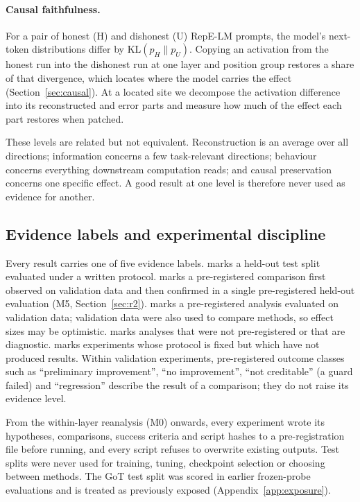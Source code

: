 \paragraph{Causal faithfulness.} For a pair of honest (H) and dishonest (U) RepE-LM prompts, the model's
next-token distributions differ by $\mathrm{KL}(p_H\|p_U)$. Copying an activation from the honest run into the
dishonest run at one layer and position group restores a share of that divergence, which locates where the model
carries the effect (Section~\ref{sec:causal}). At a located site we decompose the activation difference into its
reconstructed and error parts and measure how much of the effect each part restores when patched.

These levels are related but not equivalent. Reconstruction is an average over all directions; information concerns
a few task-relevant directions; behaviour concerns everything downstream computation reads; and causal preservation
concerns one specific effect. A good result at one level is therefore never used as evidence for another.

\subsection{Evidence labels and experimental discipline}\label{sec:evidence}

Every result carries one of five evidence labels.  marks a held-out test split evaluated under a
written protocol.  marks a pre-registered comparison first observed on validation data and
then confirmed in a single pre-registered held-out evaluation (M5, Section~\ref{sec:r2}).  marks a
pre-registered analysis evaluated on validation data; validation data were also used to compare methods, so effect
sizes may be optimistic.  marks analyses that were not pre-registered or that are diagnostic.
 marks experiments whose protocol is fixed but which have not produced results. Within
validation experiments, pre-registered outcome classes such as ``preliminary improvement'', ``no improvement'', ``not
creditable'' (a guard failed) and ``regression'' describe the result of a comparison; they do not raise its evidence
level.

From the within-layer reanalysis (M0) onwards, every experiment wrote its hypotheses, comparisons, success criteria
and script hashes to a pre-registration file before running, and every script refuses to overwrite existing outputs.
Test splits were never used for training, tuning, checkpoint selection or choosing between methods. The GoT test split
was scored in earlier frozen-probe evaluations and is treated as previously exposed (Appendix~\ref{app:exposure}).

